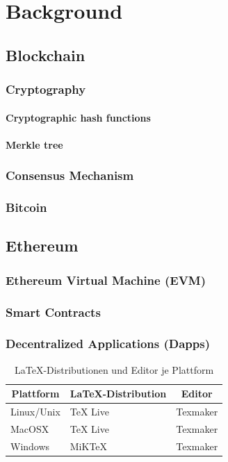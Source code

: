 \documentclass[11pt,a4paper]{report}
\begin{document}
\chapter{Background} \label{ch:background}

\section{Blockchain} \label{}
\subsection{Cryptography}
\subsubsection{Cryptographic hash functions}
\subsubsection{Merkle tree}
\subsection{Consensus Mechanism}
\subsection{Bitcoin}
\section{Ethereum}
\subsection{Ethereum Virtual Machine (EVM)}
\subsection{Smart Contracts}
\subsection{Decentralized Applications (Dapps)}

\begin{table}
\centering
\begin{tabular}{|l||l|l|}
\hline
\multicolumn{1}{|c|}{\textbf{Plattform}} & 
\multicolumn{1}{|c|}{\textbf{\LaTeX-Distribution}} & 
\multicolumn{1}{|c|}{\textbf{Editor}} \\\hline\hline
Linux/Unix & TeX Live & Texmaker \\\hline
MacOSX     & TeX Live & Texmaker \\\hline
Windows    & MiKTeX   & Texmaker \\\hline   
\end{tabular}
\caption{\LaTeX-Distributionen und Editor je Plattform}
\label{tab:disteditplattform}
\end{table}
\end{document}

